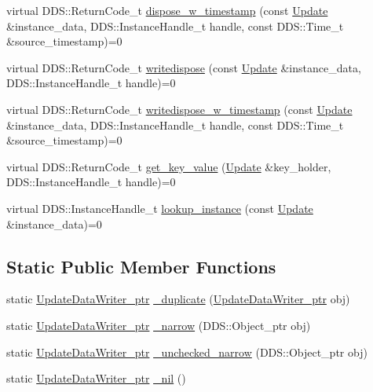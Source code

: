 \begin{DoxyCompactItemize}
\item 
virtual DDS::ReturnCode\_\-t \hyperlink{classKnowledge_1_1UpdateDataWriter_a50d362b09b20074aeabc09d38f7b0c48}{dispose\_\-w\_\-timestamp} (const \hyperlink{structKnowledge_1_1Update}{Update} \&instance\_\-data, DDS::InstanceHandle\_\-t handle, const DDS::Time\_\-t \&source\_\-timestamp)=0
\item 
virtual DDS::ReturnCode\_\-t \hyperlink{classKnowledge_1_1UpdateDataWriter_a6e218acc41814ce89ffe15853ce38793}{writedispose} (const \hyperlink{structKnowledge_1_1Update}{Update} \&instance\_\-data, DDS::InstanceHandle\_\-t handle)=0
\item 
virtual DDS::ReturnCode\_\-t \hyperlink{classKnowledge_1_1UpdateDataWriter_afe1c5a5855bd28307ae2d7c290e80166}{writedispose\_\-w\_\-timestamp} (const \hyperlink{structKnowledge_1_1Update}{Update} \&instance\_\-data, DDS::InstanceHandle\_\-t handle, const DDS::Time\_\-t \&source\_\-timestamp)=0
\item 
virtual DDS::ReturnCode\_\-t \hyperlink{classKnowledge_1_1UpdateDataWriter_a917b2cbb12d7cae6728d5c967a1f8b31}{get\_\-key\_\-value} (\hyperlink{structKnowledge_1_1Update}{Update} \&key\_\-holder, DDS::InstanceHandle\_\-t handle)=0
\item 
virtual DDS::InstanceHandle\_\-t \hyperlink{classKnowledge_1_1UpdateDataWriter_a12ad831750e179515bcbe7d59c76a7af}{lookup\_\-instance} (const \hyperlink{structKnowledge_1_1Update}{Update} \&instance\_\-data)=0
\end{DoxyCompactItemize}
\subsection*{Static Public Member Functions}
\begin{DoxyCompactItemize}
\item 
static \hyperlink{classKnowledge_1_1UpdateDataWriter}{UpdateDataWriter\_\-ptr} \hyperlink{classKnowledge_1_1UpdateDataWriter_af765e0494607134f1fbbb499e294af09}{\_\-duplicate} (\hyperlink{classKnowledge_1_1UpdateDataWriter}{UpdateDataWriter\_\-ptr} obj)
\item 
static \hyperlink{classKnowledge_1_1UpdateDataWriter}{UpdateDataWriter\_\-ptr} \hyperlink{classKnowledge_1_1UpdateDataWriter_a293fb5fce23ba55e5d49f37e7930f028}{\_\-narrow} (DDS::Object\_\-ptr obj)
\item 
static \hyperlink{classKnowledge_1_1UpdateDataWriter}{UpdateDataWriter\_\-ptr} \hyperlink{classKnowledge_1_1UpdateDataWriter_a903acf2542111e68cd1c2ae363db707f}{\_\-unchecked\_\-narrow} (DDS::Object\_\-ptr obj)
\item 
static \hyperlink{classKnowledge_1_1UpdateDataWriter}{UpdateDataWriter\_\-ptr} \hyperlink{classKnowledge_1_1UpdateDataWriter_a2261a52efe9330bb273861350a033b7f}{\_\-nil} ()
\end{DoxyCompactItemize}
